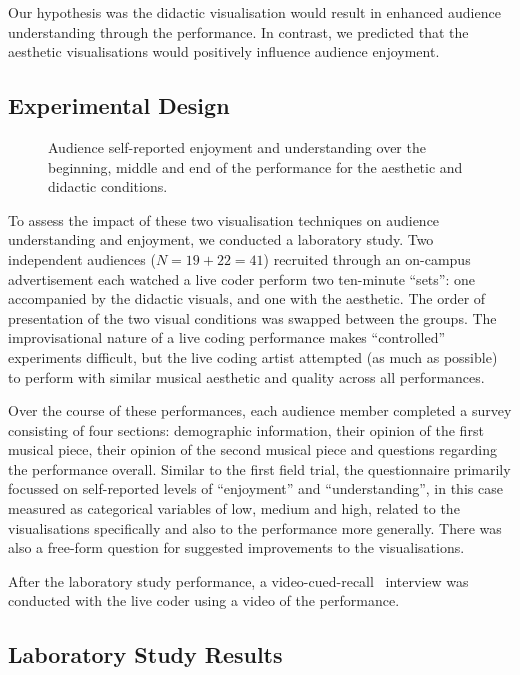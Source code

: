 \documentclass{sig-alternate}
\begin{document}
Our hypothesis was the didactic visualisation would result in enhanced
audience understanding through the performance. In contrast, we
predicted that the aesthetic visualisations would positively influence
audience enjoyment.

\subsection{Experimental Design}

\begin{figure*}
\centering
{}
\caption{Audience self-reported enjoyment and understanding over the
beginning, middle and end of the performance for the aesthetic and
didactic conditions.}
\label{fig:enjoyment-understanding}
\end{figure*}

To assess the impact of these two visualisation techniques on audience
understanding and enjoyment, we conducted a laboratory study. Two
independent audiences ($N=19+22=41$) recruited through an on-campus
advertisement each watched a live coder perform two ten-minute
``sets'': one accompanied by the didactic visuals, and one with the
aesthetic. The order of presentation of the two visual conditions was
swapped between the groups. The improvisational nature of a live
coding performance makes ``controlled'' experiments difficult, but the
live coding artist attempted (as much as possible) to perform with
similar musical aesthetic and quality across all performances.

Over the course of these performances, each audience member completed
a survey consisting of four sections: demographic information, their
opinion of the first musical piece, their opinion of the second
musical piece and questions regarding the performance overall. Similar
to the first field trial, the questionnaire primarily focussed on
self-reported levels of ``enjoyment'' and ``understanding'', in this
case measured as categorical variables of low, medium and high,
related to the visualisations specifically and also to the performance
more generally. There was also a free-form question for suggested
improvements to the visualisations.

After the laboratory study performance, a
video-cued-recall~\cite{Suchman:1992tk} interview was conducted with
the live coder using a video of the performance.

\subsection{Laboratory Study Results}
\end{document}
